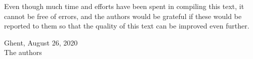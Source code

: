 Even though much time and efforts have been spent in compiling this text, it cannot be free of errors, and the authors would be grateful if these would be reported to them so that the quality of this text can be improved even further.
\vspace*{3cm}


\begin{flushleft}
Ghent, August 26, 2020\\[0.5cm]
The authors
\end{flushleft}